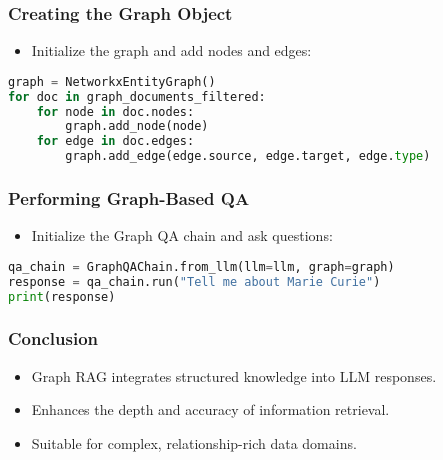 \begin{frame}[fragile]\frametitle{Creating the Graph Object}
  \begin{itemize}
    \item Initialize the graph and add nodes and edges:
  \end{itemize}
  \begin{lstlisting}[language=python]
graph = NetworkxEntityGraph()
for doc in graph_documents_filtered:
    for node in doc.nodes:
        graph.add_node(node)
    for edge in doc.edges:
        graph.add_edge(edge.source, edge.target, edge.type)
  \end{lstlisting}
\end{frame}

\begin{frame}[fragile]\frametitle{Performing Graph-Based QA}
  \begin{itemize}
    \item Initialize the Graph QA chain and ask questions:
  \end{itemize}
  \begin{lstlisting}[language=python]
qa_chain = GraphQAChain.from_llm(llm=llm, graph=graph)
response = qa_chain.run("Tell me about Marie Curie")
print(response)
  \end{lstlisting}
\end{frame}

\begin{frame}[fragile]\frametitle{Conclusion}
  \begin{itemize}
    \item Graph RAG integrates structured knowledge into LLM responses.
    \item Enhances the depth and accuracy of information retrieval.
    \item Suitable for complex, relationship-rich data domains.
  \end{itemize}
\end{frame}



